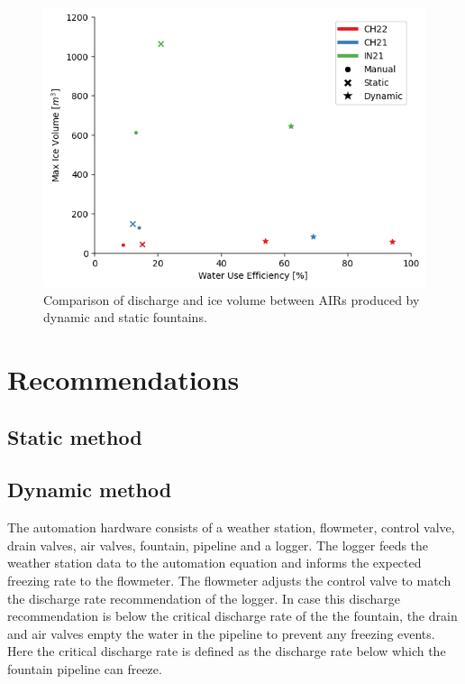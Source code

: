 \documentclass[utf8]{frontiersSCNS}
\begin{document}
\begin{figure}[ht]
	\begin{center}
		\includegraphics[width=\linewidth]{Figures/wue.png}
	\end{center}
	\caption{Comparison of discharge and ice volume between AIRs produced by dynamic and static fountains. }
	\label{fig:old_icestupa}
\end{figure}

\section{Recommendations}
\subsection{Static method}
\subsection{Dynamic method}

The automation hardware consists of a weather station, flowmeter, control valve, drain valves, air valves,
fountain, pipeline and a logger. The logger feeds the weather station data to the automation equation and
informs the expected freezing rate to the flowmeter. The flowmeter adjusts the control valve to match the
discharge rate recommendation of the logger. In case this discharge recommendation is below the critical
discharge rate of the the fountain, the drain and air valves empty the water in the pipeline to prevent any
freezing events. Here the critical discharge rate is defined as the discharge rate below which the fountain
pipeline can freeze.
\end{document}
